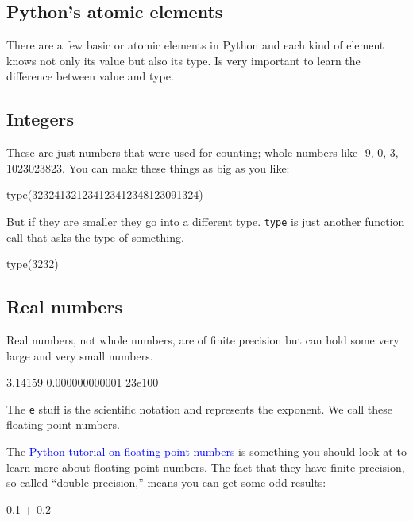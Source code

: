 \begin{fullwidth}
\section{Python's atomic elements}

There are a few basic or atomic elements in Python and each kind of element knows not only its value but also its type. Is very important to learn the difference between value and type.

\subsection{Integers}

These are just numbers that were used for counting; whole numbers like -9, 0, 3, 1023023823. You can make these things as big as you like:
 
\begin{pyconsole}[a]
type(323241321234123412348123091324)
\end{pyconsole}

But if they are smaller they go into a different type. {\tt type} is just another function call that asks the type of something.

\begin{pyconsole}[b]
type(3232)
\end{pyconsole}

\subsection{Real numbers}
 
Real numbers, not whole numbers, are of finite precision but can hold some very large and very small numbers.

\begin{pyconsole}[c]
3.14159
0.000000000001
23e100
\end{pyconsole}

The {\tt e} stuff is the scientific notation and represents the exponent. We call these floating-point numbers.

The \href{https://docs.python.org/2/tutorial/floatingpoint.html}{\textcolor{blue}{Python tutorial on floating-point numbers}} is something you should look at to learn more about floating-point numbers. The fact that they have finite precision, so-called ``double precision,'' means you can get some odd results:

\begin{pyconsole}[z]
0.1 + 0.2
\end{pyconsole}


\end{fullwidth}

